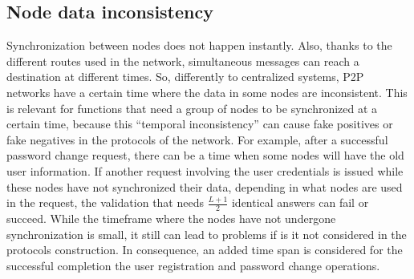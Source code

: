 


%
%

\subsection{Node data inconsistency}
Synchronization between nodes does not happen instantly. Also, thanks to
the different routes used in the network, simultaneous messages can reach a
destination at different times. So, differently to centralized systems, P2P
networks have a certain time where the data in some nodes are inconsistent.
This is relevant for functions that need a
group of nodes to be synchronized at a certain time, because this ``temporal
inconsistency''  can cause fake positives or fake negatives in the protocols of
the network. For example, after a successful password change request, there can
be a time when some nodes will have the old user information. If another
request involving the user credentials is issued while these nodes have not
synchronized their data, depending in what nodes are used in the request, the
validation that needs $\frac{L+1}{2}$ identical answers can fail or succeed.
While the timeframe where the nodes have not undergone synchronization is small,
it still can lead to problems if is it not considered in the protocols
construction. In consequence, an added time span is considered for the
successful completion the user registration and password change operations.



